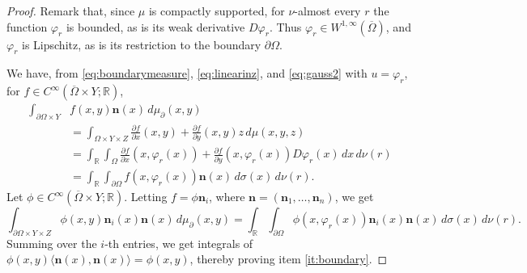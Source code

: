 \documentclass{article}
\newcommand{\R}{\mathbb{R}}
\theoremstyle{definition}
\theoremstyle{remark}
\begin{document}
\begin{proof}
%
%
%

Remark that, since $\mu$ is compactly supported, for $\nu$-almost every $r$ the function $\varphi_r$ is bounded, as is its weak derivative $D\varphi_r$. Thus $\varphi_r\in W^{1,\infty}(\overline\Omega)$, and $\varphi_r$ is Lipschitz, as is its restriction to the boundary $\partial\Omega$. %

 We have, from  \eqref{eq:boundarymeasure}, \eqref{eq:linearinz}, and \eqref{eq:gauss2} with $u=\varphi_r$, for $f\in C^\infty(\overline \Omega\times Y;\R)$, 
 \begin{align*}
     \int_{\partial\Omega\times Y}&f(x,y)\mathbf n(x)\,d\mu_\partial(x,y)\\
     &=\int_{\Omega\times Y\times Z}\frac{\partial f}{\partial x}(x,y)+\frac{\partial f}{\partial y}(x,y)z\,d\mu(x,y,z)\\
     &=\int_\R\int_{\Omega}\frac{\partial f}{\partial x}(x,\varphi_r(x))+\frac{\partial f}{\partial y}(x,\varphi_r(x))D\varphi_r(x)\,dx\,d\nu(r)\\
     &=\int_\R\int_{\partial \Omega}f(x,\varphi_r(x))\mathbf n(x)\,d\sigma(x)\,d\nu(r).
 \end{align*}
 Let $\phi\in C^\infty(\overline\Omega\times Y;\R)$.
 Letting $f=\phi\mathbf n_i$, where $\mathbf n=(\mathbf n_1,\dots,\mathbf n_n)$, we get
 \[\int_{\partial\Omega\times Y\times Z}\phi(x,y)\mathbf n_i(x)\mathbf n(x)\,d\mu_\partial(x,y)=
 \int_\R\int_{\partial \Omega}\phi(x,\varphi_r(x))\mathbf n_i(x)\mathbf n(x)\,d\sigma(x)\,d\nu(r).\]
 Summing over the $i$-th entries, we get integrals of $\phi(x,y)\langle\mathbf n(x),\mathbf n(x)\rangle=\phi(x,y)$, thereby proving item \ref{it:boundary}.
\end{proof}
%
\end{document}
